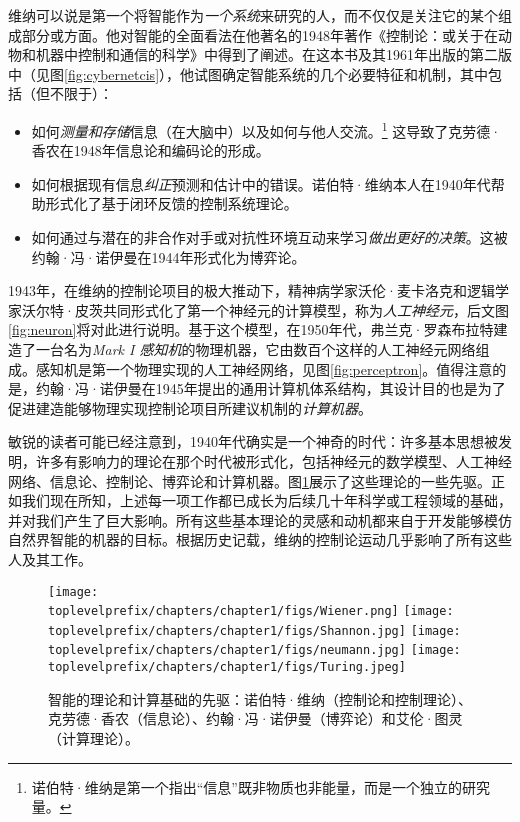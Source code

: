 \documentclass[../../book-main.tex]{subfiles}
\begin{document}
维纳可以说是第一个将智能作为{\em 一个系统}来研究的人，而不仅仅是关注它的某个组成部分或方面。他对智能的全面看法在他著名的1948年著作《控制论：或关于在动物和机器中控制和通信的科学》\cite{Wiener-Cybernetics-1948}中得到了阐述。在这本书及其1961年出版的第二版中（见图\ref{fig:cybernetcis}），他试图确定智能系统的几个必要特征和机制，其中包括（但不限于）：
\begin{itemize}
    \item 如何{\em 测量和存储}信息（在大脑中）以及如何与他人交流。\footnote{诺伯特·维纳是第一个指出“信息”既非物质也非能量，而是一个独立的研究量。} 这导致了克劳德·香农在1948年信息论和编码论的形成。
    \item 如何根据现有信息{\em 纠正}预测和估计中的错误。诺伯特·维纳本人在1940年代帮助形式化了基于闭环反馈的控制系统理论。
    \item 如何通过与潜在的非合作对手或对抗性环境互动来学习{\em 做出更好的决策}。这被约翰·冯·诺伊曼在1944年形式化为博弈论。
\end{itemize}
1943年，在维纳的控制论项目的极大推动下，精神病学家沃伦·麦卡洛克和逻辑学家沃尔特·皮茨共同形式化了第一个神经元的计算模型\cite{McCulloch-Pitts}，称为{\em 人工神经元}，后文图\ref{fig:neuron}将对此进行说明。基于这个模型，在1950年代，弗兰克·罗森布拉特建造了一台名为{\em Mark I 感知机}的物理机器，它由数百个这样的人工神经元网络组成。感知机是第一个物理实现的人工神经网络，见图\ref{fig:perceptron}。值得注意的是，约翰·冯·诺伊曼在1945年提出的通用计算机体系结构，其设计目的也是为了促进建造能够物理实现控制论项目所建议机制的{\em 计算机器}。

敏锐的读者可能已经注意到，1940年代确实是一个神奇的时代：许多基本思想被发明，许多有影响力的理论在那个时代被形式化，包括神经元的数学模型、人工神经网络、信息论、控制论、博弈论和计算机器。图\ref{fig:god-fathers}展示了这些理论的一些先驱。正如我们现在所知，上述每一项工作都已成长为后续几十年科学或工程领域的基础，并对我们产生了巨大影响。所有这些基本理论的灵感和动机都来自于开发能够模仿自然界智能的机器的目标。根据历史记载，维纳的控制论运动几乎影响了所有这些人及其工作。
\begin{figure}
    \centering
    \texttt{[image: \\toplevelprefix/chapters/chapter1/figs/Wiener.png]}
    \texttt{[image: \\toplevelprefix/chapters/chapter1/figs/Shannon.jpg]}
    \texttt{[image: \\toplevelprefix/chapters/chapter1/figs/neumann.jpg]}
    \texttt{[image: \\toplevelprefix/chapters/chapter1/figs/Turing.jpeg]}
    \caption{智能的理论和计算基础的先驱：诺伯特·维纳（控制论和控制理论）、克劳德·香农（信息论）、约翰·冯·诺伊曼（博弈论）和艾伦·图灵（计算理论）。}
    \label{fig:god-fathers}
\end{figure}
\end{document}
